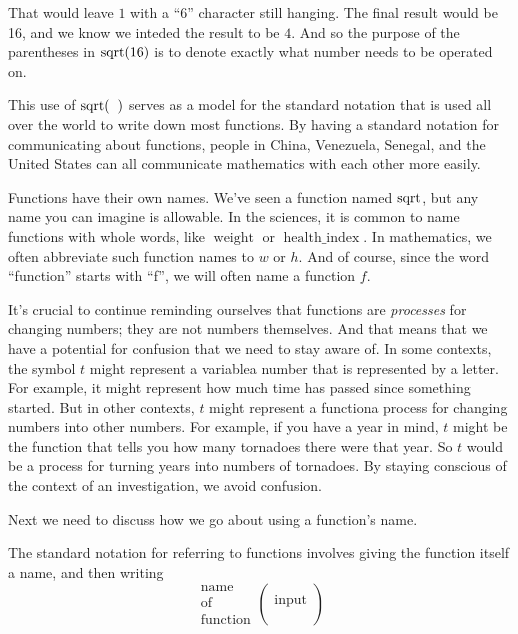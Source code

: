 		That would leave $1$ with a ``6'' character still hanging. The final result would be \num{16}, and we know we inteded the  
		result to be $4$. And so the purpose of the parentheses in $\sq[\num{16}]$ is 
		to denote exactly what number needs to be operated on.
%
\par This use of $\sq[(]$ serves as a model for the standard notation that is used all over the world to
        	write down most functions. By having a standard notation for communicating about functions,
        	people in China, Venezuela, Senegal, and the United States can all communicate mathematics
        	with each other more easily.
%
\par Functions have their own names. We've seen a function named $\sq$, but any name you can
        	imagine is allowable. In the sciences, it is common to name functions with whole words,
        	like $\operatorname{weight}$ or $\operatorname{health\_index}$. In mathematics, we often
            abbreviate such function names to $w$ or $h$. And of course, since the word ``function''
            starts with ``f'', we will often name a function $f$.
%
\par It's crucial to continue reminding ourselves that functions are \emph{processes} for
        	changing numbers; they are not numbers themselves. And that means that we have a potential
        	for confusion that we need to stay aware of. In some contexts, the symbol $t$ might
        	represent a variablea number that is represented by a letter. For example, it might represent 
		how much time has passed since something started. But in other contexts, $t$
        	might represent a functiona process for changing numbers into other numbers. For example, if you 
		have a year in mind, $t$ might be the function that tells you how many tornadoes there were that year. 
		So $t$ would be a process for turning years into numbers of tornadoes. By
        	staying conscious of the context of an investigation, we avoid confusion.
%
\par Next we need to discuss how we go about using a function's name.
%
\begin{specialnote}
The standard notation for referring to functions involves giving the function itself a name, and then writing
			\begin{displaymath}\begin{array}{cc}
                                \text{name}\\
                                \text{of}\\
                                \text{function}
                        \end{array}
                        \left(
                        \begin{array}{cc}
                                \\
                                \text{input}\\
                                \\
                        \end{array}\right)\end{displaymath}\end{specialnote}
